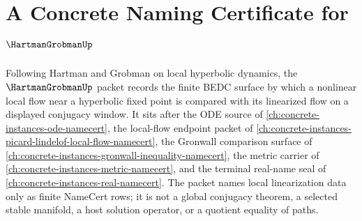 \chapter{A Concrete Naming Certificate for $\HartmanGrobmanUp$}
\label{ch:concrete-instances-hartman-grobman-namecert}

Following Hartman and Grobman on local hyperbolic dynamics, the $\HartmanGrobmanUp$ packet records the finite BEDC surface by which a nonlinear local flow near a hyperbolic fixed point is compared with its linearized flow on a displayed conjugacy window. It sits after the ODE source of \autoref{ch:concrete-instances-ode-namecert}, the local-flow endpoint packet of \autoref{ch:concrete-instances-picard-lindelof-local-flow-namecert}, the Gronwall comparison surface of \autoref{ch:concrete-instances-gronwall-inequality-namecert}, the metric carrier of \autoref{ch:concrete-instances-metric-namecert}, and the terminal real-name seal of \autoref{ch:concrete-instances-real-namecert}. The packet names local linearization data only as finite NameCert rows; it is not a global conjugacy theorem, a selected stable manifold, a host solution operator, or a quotient equality of paths.

